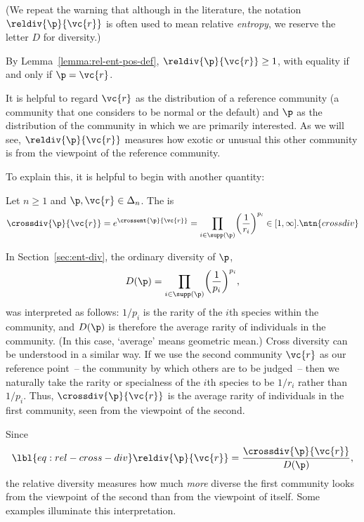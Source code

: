 (We repeat the warning that although in the literature, the notation
$\reldiv{\p}{\vc{r}}$ is often used to mean relative \emph{entropy}, we
reserve the letter $D$ for diversity.)

By Lemma~\ref{lemma:rel-ent-pos-def}, $\reldiv{\p}{\vc{r}} \geq 1$, with
equality if and only if $\p = \vc{r}$.  

It is helpful to regard $\vc{r}$ as the distribution of a reference%
% 
%
% 
community (a community that one considers to be normal or the
default) and $\p$ as the distribution of the community in which we
are primarily interested.  As
we will see, $\reldiv{\p}{\vc{r}}$ measures how exotic or unusual this
other community is from the viewpoint of the reference community.

To explain this, it is helpful to begin with another quantity:
% 
\begin{defn}
Let $n \geq 1$ and $\p, \vc{r} \in \Delta_n$.  The 
 is
\[
\crossdiv{\p}{\vc{r}}
=
e^{\crossent{\p}{\vc{r}}}
=
\prod_{i \in \supp(\p)} 
\biggl( \frac{1}{r_i} \biggr)^{p_i}
\in
[1, \infty].
\ntn{crossdiv}
\]
\end{defn}

In Section~\ref{sec:ent-div}, the ordinary diversity of $\p$, 
\[
D(\p) = \prod_{i \in \supp(\p)} \biggl( \frac{1}{p_i} \biggr)^{p_i},
\]
was interpreted as follows: $1/p_i$ is the rarity of the
$i$th species within the community, and $D(\p)$ is therefore the average
rarity of individuals in the community.  (In this case, `average' means
geometric mean.)
% 
Cross diversity can be understood in a similar way.  If we use the second
community $\vc{r}$ as our reference point~-- the community by which others
are to be judged~-- then we naturally take the rarity or
specialness of the $i$th species to be $1/r_i$ rather
than $1/p_i$.  Thus, $\crossdiv{\p}{\vc{r}}$ is the average rarity of
individuals in the first community, seen from the viewpoint of the second.

Since
% 
\begin{equation}
\lbl{eq:rel-cross-div}
\reldiv{\p}{\vc{r}} 
=
\frac{\crossdiv{\p}{\vc{r}}}{D(\p)},
\end{equation}
% 
the relative diversity measures how much \emph{more} diverse the first
community looks from the viewpoint of the second than from the viewpoint of
itself.  Some examples illuminate this interpretation.

